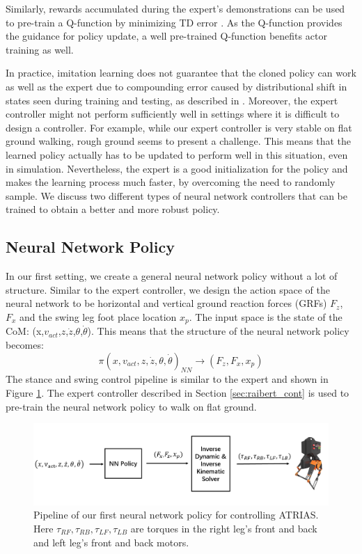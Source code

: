 Similarly, rewards accumulated during the expert's demonstrations can be used to pre-train a Q-function by minimizing TD error \citep{sendonaris2017learning}. As the Q-function provides the guidance for policy update, a well pre-trained Q-function benefits actor training as well. 

In practice, imitation learning does not guarantee that the cloned policy can work as well as the expert due to compounding error caused by distributional shift in states seen during training and testing, as described in  \cite{ross2010efficient}. Moreover, the expert controller might not perform sufficiently well in settings where it is difficult to design a controller. For example, while our expert controller is very stable on flat ground walking, rough ground seems to present a challenge. This means that the learned policy actually has to be updated to perform well in this situation, even in simulation. Nevertheless, the expert is a good initialization for the policy and makes the learning process much faster, by overcoming the need to randomly sample. We discuss two different types of neural network controllers that can be trained to obtain a better and more robust policy. 

\subsection{Neural Network Policy}
\label{NN_P}

In our first setting, we create a general neural network policy without a lot of structure. Similar to the expert controller, we design the action space of the neural network to be horizontal and vertical ground  reaction forces (GRFs) $F_z$, $F_x$ and the swing leg foot place location $x_p$. The input space is the state of the CoM:  (x,$v_{act}$,$z$,$\dot{z}$,$\theta$,$\dot{\theta}$). This means that the structure of the neural network policy becomes:
\begin{equation}
    \pi(x,v_{act},z,\dot{z},\theta,\dot{\theta})_{NN} \rightarrow  (F_z, F_x,x_p)
\end{equation}
The stance and swing control pipeline is similar to the expert and shown in Figure \ref{fig:NN_process}. The expert controller described in Section \ref{sec:raibert_cont} is used to pre-train the neural network policy to walk on flat ground.

\begin{figure}[!h]
	\centering
	\includegraphics[width=.7\textwidth]{./img/NN.PNG}
    \caption{Pipeline of our first neural network policy for controlling ATRIAS. Here $\tau_{RF},\tau_{RB},\tau_{LF},\tau_{LB}$ are torques in the right leg's front and back and left leg's front and back motors.}
    \label{fig:NN_process}
\end{figure}


